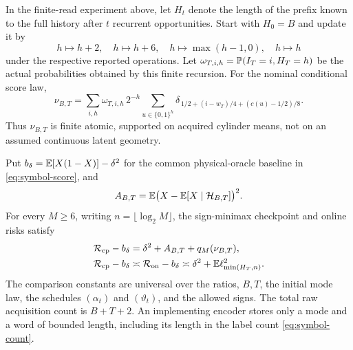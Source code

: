 \begin{theorem}\label{thm:singular}
In the finite-read experiment above, let $H_t$ denote the length of the prefix known to the full history after $t$ recurrent opportunities. Start with $H_0=B$ and update it by
\[
 h\mapsto h+2,\quad h\mapsto h+6,\quad
 h\mapsto\max(h-1,0),\quad h\mapsto h
\]
under the respective reported operations. Let $\omega_{T,i,h}=\mathbb P(I_T=i,H_T=h)$ be the actual probabilities obtained by this finite recursion. For the nominal conditional score law,
\begin{equation}\label{eq:atomic-law}
 \nu_{B,T}=\sum_{i,h}\omega_{T,i,h}\,2^{-h}
      \sum_{u\in\{0,1\}^h}
       \delta_{\,1/2+(i-w_T)/4+(c(u)-1/2)/8}.
\end{equation}
Thus $\nu_{B,T}$ is finite atomic, supported on acquired cylinder means, not on an assumed continuous latent geometry.

Put $b_\delta=\mathbb E[X(1-X)]-\delta^2$ for the common physical-oracle baseline in \eqref{eq:symbol-score}, and
\[
 A_{B,T}=\mathbb E\bigl(X-\mathbb E[X\mid\mathcal H_{B,T}]\bigr)^2.
\]
For every $M\ge6$, writing $n=\lfloor\log_2M\rfloor$, the sign-minimax checkpoint and online risks satisfy
\begin{align}
 \mathcal R_{\mathrm{cp}}-b_\delta
    &=\delta^2+A_{B,T}+q_M(\nu_{B,T}),\label{eq:symbol-exact}\\
 \mathcal R_{\mathrm{cp}}-b_\delta
    &\asymp\mathcal R_{\mathrm{on}}-b_\delta
     \asymp\delta^2+\mathbb E\ell_{\min(H_T,n)}^2.\label{eq:symbol-law}
\end{align}
The comparison constants are universal over the ratios, $B,T$, the initial mode law, the schedules $(\alpha_t)$ and $(\vartheta_t)$, and the allowed signs. The total raw acquisition count is $B+T+2$. An implementing encoder stores only a mode and a word of bounded length, including its length in the label count \eqref{eq:symbol-count}.
\end{theorem}
